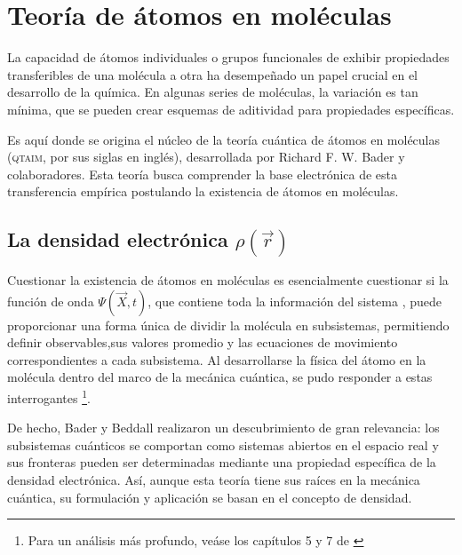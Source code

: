 \section{Teoría de átomos en moléculas}
  La capacidad de átomos individuales o grupos funcionales de exhibir
  propiedades transferibles de una molécula a otra ha desempeñado un
  papel crucial en el desarrollo de la química. En algunas series de
  moléculas, la variación es tan mínima, que se pueden crear esquemas
  de aditividad para propiedades específicas.
  
  Es aquí donde se origina el núcleo de la teoría cuántica de átomos 
  en moléculas (\textsc{qtaim}, por sus siglas en inglés), desarrollada
  por Richard F. W. Bader y colaboradores. Esta teoría busca comprender
  la base electrónica de esta transferencia empírica postulando la 
  existencia de átomos en moléculas.
\subsection{La densidad electrónica $\rho(\vec{r})$}
  Cuestionar la existencia de átomos en moléculas es esencialmente cuestionar si 
	la función de onda $\Psi(\vec{X}, t)$, que contiene toda la información del sistema 
	\cite{cohen1}, puede proporcionar una forma única de dividir la molécula en subsistemas, 
	permitiendo definir observables,sus valores promedio y las ecuaciones de movimiento 
  correspondientes a cada subsistema. Al desarrollarse la física del átomo en la molécula 
  dentro del marco de la mecánica cuántica, se pudo responder a estas interrogantes 
  \footnote{Para un análisis más profundo, veáse los capítulos 5 y 7 de \cite{badero}}.
		
	De hecho, Bader y Beddall \cite{bader1972} realizaron un descubrimiento de gran relevancia: los 
  subsistemas cuánticos se comportan como sistemas abiertos en el espacio real y sus fronteras 
  pueden ser determinadas mediante una propiedad específica de la densidad electrónica. Así, aunque 
  esta teoría tiene sus raíces en la mecánica cuántica, su formulación y aplicación se basan en el 
  concepto de densidad. 
		
